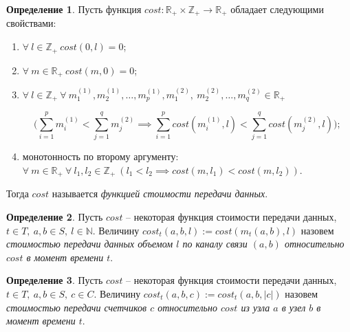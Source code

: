\documentclass{article}
\theoremstyle{plain}
\theoremstyle{plain}
\theoremstyle{plain}
\theoremstyle{plain}
\theoremstyle{definition}
\newtheorem{definition}{Определение}[section]
\theoremstyle{remark}
\theoremstyle{plain}
\begin{document}
\begin{definition}
\label{CostFunctionDefinition}
    Пусть функция $cost : \mathbb{R}_{+} \times \mathbb{Z}_{+} \to \mathbb{R}_{+}$ обладает следующими свойствами:
    \begin{enumerate}
        \item $\forall\ l \in \mathbb{Z}_{+}\ cost(0, l) = 0$;
        
        \item $\forall\ m \in \mathbb{R}_{+}\ cost(m, 0) = 0$;
        
        
        \item $\forall\ l \in \mathbb{Z}_{+}\ \forall\ m_1^{(1)}, m_2^{(1)}, \ldots, m_p^{(1)}, m_1^{(2)},\ m_2^{(2)}, \ldots, m_q^{(2)} \in \mathbb{R}_{+}$ 
        
        \begin{equation*}
            \Big( \displaystyle \sum_{i = 1}^p m_i^{(1)} < \displaystyle \sum_{j = 1}^q m_j^{(2)} \implies \displaystyle \sum_{i = 1}^p cost(m_i^{(1)}, l) < \displaystyle \sum_{j = 1}^q cost(m_j^{(2)}, l) \Big);
        \end{equation*}
        
        \item монотонность по второму аргументу: $\forall\ m \in \mathbb{R}_{+}\ \forall\ l_1, l_2 \in \mathbb{Z}_{+}\ (l_1 < l_2 \implies cost(m, l_1) < cost(m, l_2))$.
    \end{enumerate}
    Тогда $cost$ называется \textit{функцией стоимости передачи данных}.
\end{definition}

\begin{definition}
    Пусть $cost$ -- некоторая функция стоимости передачи данных, $t \in T,\ a, b \in S,\ l \in \mathbb{N}$. Величину $cost_t(a, b, l) := cost(m_t(a, b), l)$ назовем \textit{стоимостью передачи данных объемом $l$ по каналу связи $(a, b)$ относительно $cost$ в момент времени $t$}.
\end{definition}

\begin{definition}
    Пусть $cost$ -- некоторая функция стоимости передачи данных, $t \in T,\ a, b \in S,\ c \in C$. Величину $cost_t(a, b, c) := cost_t(a, b, |c|)$ назовем \textit{стоимостью передачи счетчиков $c$ относительно $cost$ из узла $a$ в узел $b$ в момент времени $t$}.
\end{definition}
\end{document}
